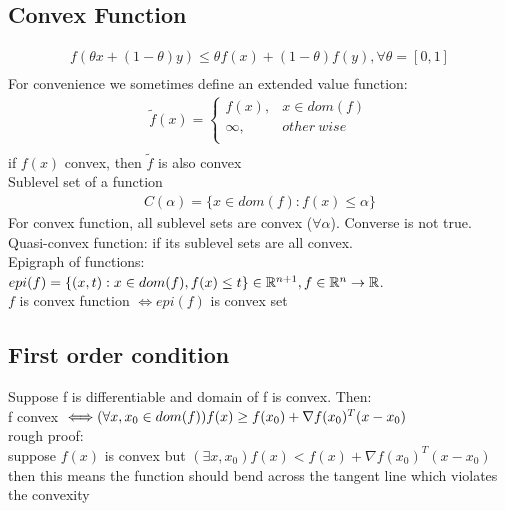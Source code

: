\message{ !name(notebook.tex)}\documentclass[8pt]{report}
\newcommand{\R}{\mathbb{R}}
\begin{document}
\begin{multicols*}{2}
  \subsection{Convex Function}
  \begin{align*}
    f(\theta x +(1-\theta) y) \leq \theta f(x) + (1-\theta) f(y), \forall \theta = [0,1]\\
  \end{align*}
  For convenience we sometimes define an extended value function:\\
  \begin{align*}
    \tilde{f}(x) = \begin{cases}
      f(x), & x \in dom(f)\\
      \infty, & other\ wise\\
    \end{cases}\\
  \end{align*}
  if $f(x)$ convex, then $\tilde{f}$ is also convex\\

  Sublevel set of a function
  \begin{align*}
    C(\alpha) = \{ x \in dom(f): f(x) \leq \alpha \}
  \end{align*}
  For convex function, all sublevel sets are convex ($\forall \alpha$). Converse is not true.\\
  
  Quasi-convex function: if its sublevel sets are all convex.\\
  
  Epigraph of functions:\\
  $epi(f)=\{(x,t): x \in dom(f), f(x) \leq t\} \in \R^{n+1}, \\f \in \R^n \to \R$.\\
  
 $f$ is convex function $\iff epi(f)$ is convex set\\

 \subsection{First order condition}
 Suppose f is differentiable and domain of f is convex. Then:\\
 f convex $\iff \\ (\forall x,x_0 \in dom(f)) f(x) \geq f(x_0) + \nabla f(x_0)^T(x-x_0)$\\

  rough proof:\\
  suppose $f(x)$ is convex but $(\exists x, x_0) f(x) < f(x) + \nabla f(x_0)^T(x-x_0)$\\
  then this means the function should bend across the tangent line which violates the convexity\\
  

\end{multicols*}
\end{document}
